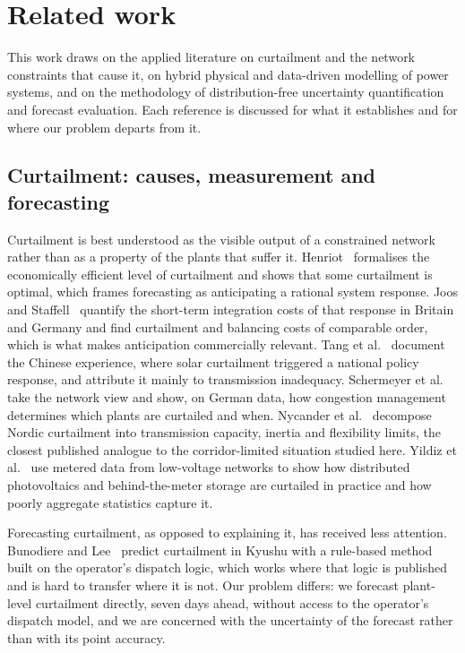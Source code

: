 \section{Related work}
\label{sec:related}

This work draws on the applied literature on curtailment and the network constraints that cause it, on hybrid physical and data-driven modelling of power systems, and on the methodology of distribution-free uncertainty quantification and forecast evaluation. Each reference is discussed for what it establishes and for where our problem departs from it.

\subsection{Curtailment: causes, measurement and forecasting}

Curtailment is best understood as the visible output of a constrained network rather than as a property of the plants that suffer it. Henriot~\cite{henriot2015} formalises the economically efficient level of curtailment and shows that some curtailment is optimal, which frames forecasting as anticipating a rational system response. Joos and Staffell~\cite{joos2018} quantify the short-term integration costs of that response in Britain and Germany and find curtailment and balancing costs of comparable order, which is what makes anticipation commercially relevant. Tang et al.~\cite{tang2018} document the Chinese experience, where solar curtailment triggered a national policy response, and attribute it mainly to transmission inadequacy. Schermeyer et al.~\cite{schermeyer2018} take the network view and show, on German data, how congestion management determines which plants are curtailed and when. Nycander et al.~\cite{nycander2020} decompose Nordic curtailment into transmission capacity, inertia and flexibility limits, the closest published analogue to the corridor-limited situation studied here. Yildiz et al.~\cite{yildiz2023} use metered data from low-voltage networks to show how distributed photovoltaics and behind-the-meter storage are curtailed in practice and how poorly aggregate statistics capture it.

Forecasting curtailment, as opposed to explaining it, has received less attention. Bunodiere and Lee~\cite{bunodiere2020} predict curtailment in Kyushu with a rule-based method built on the operator's dispatch logic, which works where that logic is published and is hard to transfer where it is not. Our problem differs: we forecast plant-level curtailment directly, seven days ahead, without access to the operator's dispatch model, and we are concerned with the uncertainty of the forecast rather than with its point accuracy.

